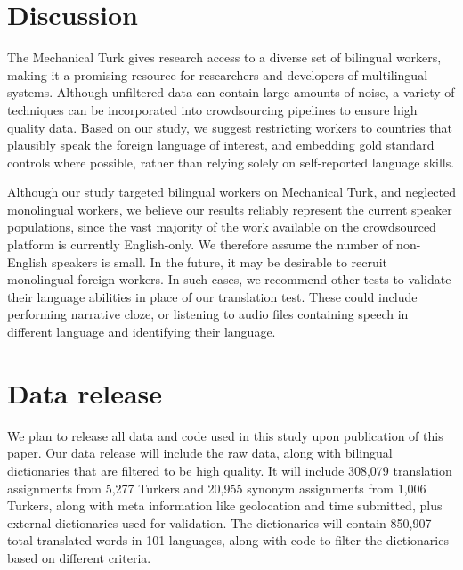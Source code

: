 \documentclass[11pt]{article}
\begin{document}
\section{Discussion}
The Mechanical Turk gives research access to a diverse set of bilingual workers, making it a promising resource for researchers and developers of multilingual systems. 
Although unfiltered data can contain large amounts of noise, 
a variety of techniques can be incorporated into crowdsourcing pipelines to ensure high quality data.  Based on our study, we suggest restricting workers to countries that plausibly speak the foreign language of interest, and embedding gold standard controls where possible, rather than relying solely on self-reported language skills.

Although our study targeted bilingual workers on Mechanical Turk, and neglected monolingual workers, we believe our results reliably represent the current speaker populations, since the vast majority of the work available on the crowdsourced platform is currently English-only.  We therefore assume the number of non-English speakers is small.  In the future, it may be desirable to recruit monolingual foreign workers.  In such cases, we recommend other tests to validate their language abilities in place of our translation test.  These could include performing narrative cloze, or listening to audio files containing speech in different language and identifying their language. 


\section{Data release}

We plan to release all data and code used in this study upon publication of this paper.  Our data release will include the raw data, along with bilingual dictionaries that are filtered to be high quality. It will include 308,079 translation assignments from 5,277 Turkers and 20,955 synonym assignments from 1,006 Turkers, along with meta information like geolocation and time submitted, plus external dictionaries used for validation. The dictionaries will contain 850,907 total translated words in 101 languages, along with code to filter the dictionaries based on different criteria. 
 



\end{document}
